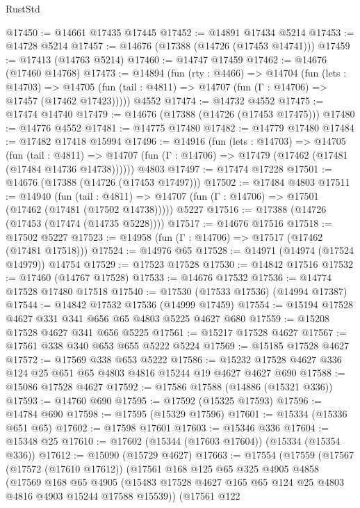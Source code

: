 \begin{lexlean}{RustStd}
\begin{coremodule}
@17450 := @14661 @17435 @17445
@17452 := @14891 @17434 @5214
@17453 := @14728 @5214
@17457 := @14676 (@17388 (@14726 (@17453 @14741)))
@17459 := @17413 (@14763 @5214)
@17460 := @14747 @17459
@17462 := @14676 (@17460 @14768)
@17473 := @14894
    (fun (rty : @4466) =>
    @14704
      (fun (lets : @14703) =>
      @14705 (fun (tail : @4811) => @14707 (fun (Γ : @14706) => @17457 (@17462 @17423)))))
    @4552
@17474 := @14732 @4552
@17475 := @17474 @14740
@17479 := @14676 (@17388 (@14726 (@17453 @17475)))
@17480 := @14776 @4552
@17481 := @14775 @17480
@17482 := @14779 @17480
@17484 := @17482 @17418 @15994
@17496 := @14916
    (fun (lets : @14703) =>
    @14705
      (fun (tail : @4811) =>
      @14707 (fun (Γ : @14706) => @17479 (@17462 (@17481 (@17484 @14736 @14738))))))
    @4803
@17497 := @17474 @17228
@17501 := @14676 (@17388 (@14726 (@17453 @17497)))
@17502 := @17484 @4803
@17511 := @14940
    (fun (tail : @4811) => @14707 (fun (Γ : @14706) => @17501 (@17462 (@17481 (@17502 @14738)))))
    @5227
@17516 := @17388 (@14726 (@17453 (@17474 (@14735 @5228))))
@17517 := @14676 @17516
@17518 := @17502 @5227
@17523 := @14958 (fun (Γ : @14706) => @17517 (@17462 (@17481 @17518)))
@17524 := @14976 @65
@17528 := @14971 (@14974 (@17524 @14979)) @14754
@17529 := @17523 @17528
@17530 := @14842 @17516
@17532 := @17460 (@14767 @17528)
@17533 := @14676 @17532
@17536 := @14774 @17528 @17480 @17518
@17540 := @17530 (@17533 @17536) (@14994 @17387)
@17544 := @14842 @17532 @17536 (@14999 @17459)
@17554 := @15194 @17528 @4627 @331 @341 @656 @65 @4803 @5225 @4627 @680
@17559 := @15208 @17528 @4627 @341 @656 @5225
@17561 := @15217 @17528 @4627
@17567 := @17561 @338 @340 @653 @655 @5222 @5224
@17569 := @15185 @17528 @4627
@17572 := @17569 @338 @653 @5222
@17586 := @15232 @17528 @4627 @336 @124 @25 @651 @65 @4803 @4816 @15244 @19 @4627 @4627 @690
@17588 := @15086 @17528 @4627
@17592 := @17586 @17588 (@14886 (@15321 @336))
@17593 := @14760 @690
@17595 := @17592 (@15325 @17593)
@17596 := @14784 @690
@17598 := @17595 (@15329 @17596)
@17601 := @15334 (@15336 @651 @65)
@17602 := @17598 @17601
@17603 := @15346 @336
@17604 := @15348 @25
@17610 := @17602 (@15344 (@17603 @17604)) (@15334 (@15354 @336))
@17612 := @15090 (@15729 @4627)
@17663 := @17554
    (@17559
      (@17567
        (@17572 (@17610 @17612))
        (@17561
          @168
          @125
          @65
          @325
          @4905
          @4858
          (@17569
            @168
            @65
            @4905
            (@15483 @17528 @4627 @165 @65 @124 @25 @4803 @4816 @4903 @15244 @17588 @15539))
          (@17561
            @122

\end{coremodule}
\end{lexlean}
